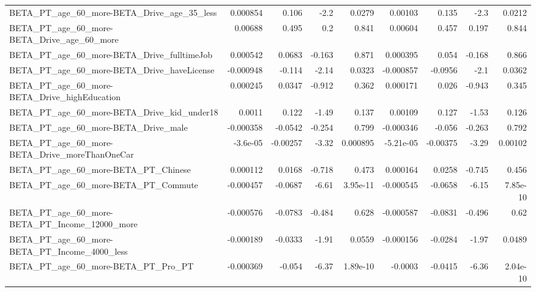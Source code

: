 \begin{tabular}{lrrrrrrrr}
BETA\_PT\_age\_60\_more-BETA\_Drive\_age\_35\_less         &    0.000854 &        0.106 &      -2.2 &   0.0279 &    0.00103 &       0.135 &         -2.3 &        0.0212 \\
BETA\_PT\_age\_60\_more-BETA\_Drive\_age\_60\_more         &     0.00688 &        0.495 &       0.2 &    0.841 &    0.00604 &       0.457 &        0.197 &         0.844 \\
BETA\_PT\_age\_60\_more-BETA\_Drive\_fulltimeJob         &    0.000542 &       0.0683 &    -0.163 &    0.871 &   0.000395 &       0.054 &       -0.168 &         0.866 \\
BETA\_PT\_age\_60\_more-BETA\_Drive\_haveLicense         &   -0.000948 &       -0.114 &     -2.14 &   0.0323 &  -0.000857 &     -0.0956 &         -2.1 &        0.0362 \\
BETA\_PT\_age\_60\_more-BETA\_Drive\_highEducation       &    0.000245 &       0.0347 &    -0.912 &    0.362 &   0.000171 &       0.026 &       -0.943 &         0.345 \\
BETA\_PT\_age\_60\_more-BETA\_Drive\_kid\_under18         &      0.0011 &        0.122 &     -1.49 &    0.137 &    0.00109 &       0.127 &        -1.53 &         0.126 \\
BETA\_PT\_age\_60\_more-BETA\_Drive\_male                &   -0.000358 &      -0.0542 &    -0.254 &    0.799 &  -0.000346 &      -0.056 &       -0.263 &         0.792 \\
BETA\_PT\_age\_60\_more-BETA\_Drive\_moreThanOneCar      &    -3.6e-05 &     -0.00257 &     -3.32 & 0.000895 &  -5.21e-05 &    -0.00375 &        -3.29 &       0.00102 \\
BETA\_PT\_age\_60\_more-BETA\_PT\_Chinese                &    0.000112 &       0.0168 &    -0.718 &    0.473 &   0.000164 &      0.0258 &       -0.745 &         0.456 \\
BETA\_PT\_age\_60\_more-BETA\_PT\_Commute                &   -0.000457 &      -0.0687 &     -6.61 & 3.95e-11 &  -0.000545 &     -0.0658 &        -6.15 &      7.85e-10 \\
BETA\_PT\_age\_60\_more-BETA\_PT\_Income\_12000\_more      &   -0.000576 &      -0.0783 &    -0.484 &    0.628 &  -0.000587 &     -0.0831 &       -0.496 &          0.62 \\
BETA\_PT\_age\_60\_more-BETA\_PT\_Income\_4000\_less       &   -0.000189 &      -0.0333 &     -1.91 &   0.0559 &  -0.000156 &     -0.0284 &        -1.97 &        0.0489 \\
BETA\_PT\_age\_60\_more-BETA\_PT\_Pro\_PT                 &   -0.000369 &       -0.054 &     -6.37 & 1.89e-10 &    -0.0003 &     -0.0415 &        -6.36 &      2.04e-10 \\

\end{tabular}
